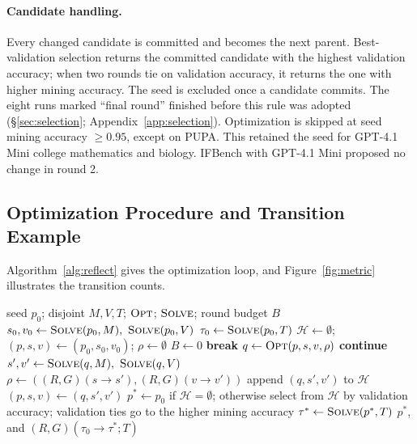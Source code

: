 \documentclass[11pt]{article}
\begin{document}
\paragraph{Candidate handling.}
Every changed candidate is committed and becomes the next parent. Best-validation selection returns the committed
candidate with the highest validation accuracy; when two rounds tie on validation accuracy, it returns the one with
higher mining accuracy. The seed is excluded once a
candidate commits. The eight runs marked ``final round'' finished before this rule was adopted (\S\ref{sec:selection};
Appendix~\ref{app:selection}). Optimization is skipped at seed mining accuracy $\geq 0.95$, except on PUPA. This
retained the seed for GPT-4.1 Mini college mathematics and biology. IFBench with GPT-4.1 Mini proposed no change in
round 2.

\subsection{Optimization Procedure and Transition Example}
\label{app:algorithm}
Algorithm~\ref{alg:reflect} gives the optimization loop, and Figure~\ref{fig:metric} illustrates the transition counts.

\begin{algorithm}[htbp]
\caption{RFDPO optimization with edit-effect feedback}
\label{alg:reflect}
\small
\begin{algorithmic}[1]
\Require seed $p_0$; disjoint $M,V,T$; $\textsc{Opt}$; $\textsc{Solve}$; round budget $B$
\State $s_0,v_0 \gets \textsc{Solve}(p_0,M),\ \textsc{Solve}(p_0,V)$
\State $\tau_0 \gets \textsc{Solve}(p_0,T)$ 
\State $\mathcal{H}\gets\emptyset$; $(p,s,v)\gets(p_0,s_0,v_0)$; $\rho\gets\emptyset$
 \State $B\gets 0$  \EndIf
{}
   \State \textbf{break} \EndIf
  \State $q\gets\textsc{Opt}(p,s,v,\rho)$ 
   \State \textbf{continue} \EndIf
  \State $s',v'\gets\textsc{Solve}(q,M),\ \textsc{Solve}(q,V)$
  \State $\rho\gets((R,G)(s\!\to\!s'),(R,G)(v\!\to\!v'))$
  \State append $(q,s',v')$ to $\mathcal{H}$ 
  \State $(p,s,v)\gets(q,s',v')$
\EndFor
\State $p^*\gets p_0$ if $\mathcal{H}=\emptyset$; otherwise select from $\mathcal{H}$
\Statex \hspace{\algorithmicindent} by validation accuracy; validation ties go to the
\Statex \hspace{\algorithmicindent} higher mining accuracy
\State $\tau^* \gets \textsc{Solve}(p^*,T)$ 
\State \Return $p^*$, and $(R,G)(\tau_0\!\to\!\tau^*;T)$
\end{algorithmic}
\end{algorithm}
\end{document}
